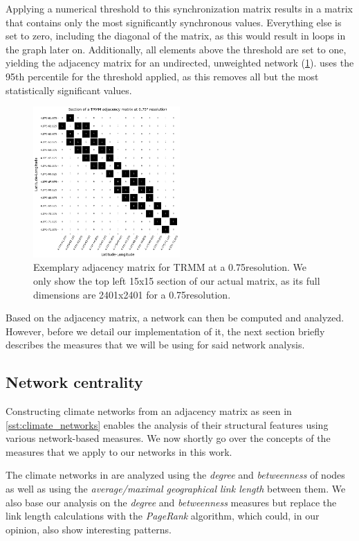 Applying a numerical threshold to this synchronization matrix results in a matrix that contains only the most significantly synchronous values. Everything else is set to zero, including the diagonal of the matrix, as this would result in loops in the graph later on. Additionally, all elements above the threshold are set to one, yielding the adjacency matrix for an undirected, unweighted network (\cref{fig:adjacency_matrix}). \citet{Stolbova.2015} uses the 95th percentile for the threshold applied, as this removes all but the most statistically significant values.

\begin{figure}[h]
  \centering
  \includegraphics[width=0.5\textwidth]{./99_appendix/img/trmm_adjacency_example}
  \caption{Exemplary adjacency matrix for TRMM at a 0.75\degree resolution. We only show the top left 15x15 section of our actual matrix, as its full dimensions are 2401x2401 for a 0.75\degree resolution.}
  \label{fig:adjacency_matrix}
\end{figure}

Based on the adjacency matrix, a network can then be computed and analyzed. However, before we detail our implementation of it, the next section briefly describes the measures that we will be using for said network analysis.

\subsection{Network centrality}
\label{sst:network_measures}
Constructing climate networks from an adjacency matrix as seen in \cref{sst:climate_networks} enables the analysis of their structural features using various network-based measures. We now shortly go over the concepts of the measures that we apply to our networks in this work.

The climate networks in \citet{Stolbova.2015} are analyzed using the \textit{degree} and \textit{betweenness} of nodes as well as using the \textit{average/maximal geographical link length} between them. We also base our analysis on the \textit{degree} and \textit{betweenness} measures but replace the link length calculations with the \textit{PageRank} algorithm, which could, in our opinion, also show interesting patterns.

